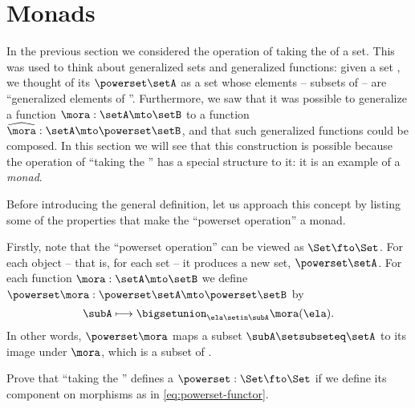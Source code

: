 
\section{Monads}
\label{sec:monads}

In the previous section we considered the operation of taking the  of a set.
This was used to think about generalized sets and generalized functions: given a set \setA, we thought of its  $\powerset \setA$ as a set whose elements -- subsets of \setA -- are ``generalized elements of \setA''.
Furthermore, we saw that it was possible to generalize a function $\mora : \setA \mto \setB$ to a function $\widehat \mora:  \setA \mto \powerset \setB$, and that such generalized functions could be composed.
In this section we will see that this construction is possible because the operation of ``taking the '' has a special structure to it: it is an example of a \emph{monad}.

Before introducing the general definition, let us approach this concept by listing some of the properties that make the ``powerset operation'' a monad.

Firstly, note that the ``powerset operation'' can be viewed as  $\Set \fto \Set$.
For each object -- that is, for each set \setA -- it produces a new set, $\powerset \setA$.
For each function $\mora: \setA \mto \setB$ we define $\powerset \mora : \powerset \setA \mto \powerset \setB$ by
\begin{equation}
    \label{eq:powerset-functor}
    \subA \longmapsto \bigsetunion_{\ela \setin \subA} \mora(\ela).
\end{equation}
In other words, $\powerset \mora$ maps a subset $\subA \setsubseteq \setA$ to its image under $\mora$, which is a subset of \setB.

\begin{gradedexercise}
    \label{ex:PowersetImageFunctor}
    Prove that ``taking the '' defines a  $\powerset : \Set \fto \Set$ if we define its component on morphisms as in \cref{eq:powerset-functor}.
\end{gradedexercise}


